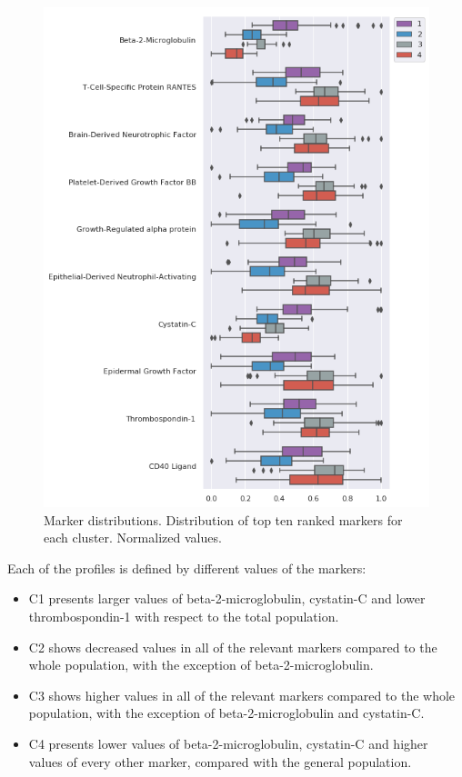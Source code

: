 \begin{figure}[!htbp]
\centering
\includegraphics[width=1.0\textwidth]{figures/cimlr/cluster_dist.png}
    \caption[Marker distributions.]{Marker distributions. Distribution of top ten ranked markers for each cluster. Normalized values.}
    \label{boxplot}
\end{figure}

Each of the profiles is defined by different values of the markers:

\begin{itemize}
    \item C1 presents larger values of beta-2-microglobulin, cystatin-C and lower thrombospondin-1 with respect to the total population.
    \item C2 shows decreased values in all of the relevant markers compared to the whole population, with the exception of beta-2-microglobulin.
    \item C3 shows higher values in all of the relevant markers compared to the whole population, with the exception of beta-2-microglobulin and cystatin-C.
    \item C4 presents lower values of beta-2-microglobulin, cystatin-C and higher values of every other marker, compared with the general population.
\end{itemize}


